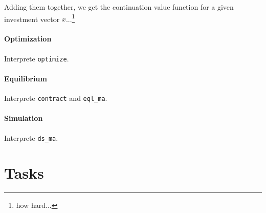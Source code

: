 \documentclass[12pt]{article}[margin=1in]
\begin{document}
Adding them together, we get the continuation value function for a given investment vector $x$...\footnote{how hard...}

\paragraph{Optimization} Interprete \verb|optimize|.

\paragraph{Equilibrium} Interprete \verb|contract| and \verb|eql_ma|.

\paragraph{Simulation} Interprete \verb|ds_ma|.

\section{Tasks}

\newpage

\end{document}
